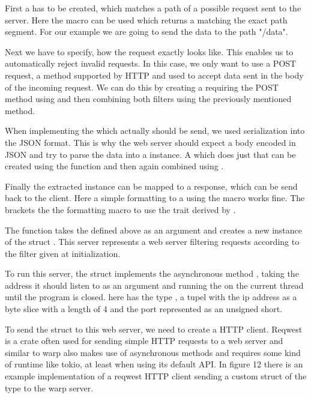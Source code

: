 First a  has to be created, which matches a path of a possible request sent to the server. Here the macro
 can be used which returns a  matching the exact path segment. For our example we
are going to send the data to the path "/data".

Next we have to specify, how the request exactly looks like. This enables us to automatically reject invalid requests.
In this case, we only want to use a POST request, a method supported by HTTP and used to accept data sent in the body
of the incoming request. We can do this by creating a  requiring the POST method using 
and then combining both filters using the previously mentioned  method.

When implementing the  which actually should be send, we used serialization into the JSON format. This is
why the web server should expect a body encoded in JSON and try to parse the data into a  instance. A
 which does just that can be created using the function  and then again combined
using .

Finally the extracted  instance can be mapped to a response, which can be send back to the client. Here a
simple formatting to a  using the  macro works fine. The  brackets the the
formatting macro to use the  trait derived by .

The function  takes the  defined above as an argument and creates a new instance of the
struct . This server represents a web server filtering requests according to the filter given at
initialization.

To run this server, the struct implements the asynchronous method , taking the address it should listen to
as an argument and running the  on the current thread until the program is closed.  here has
the type , a tupel with the ip address as a byte slice with a length of 4 and the port represented
as an unsigned short.

To send the struct to this web server, we need to create a HTTP client. Reqwest is a crate often used for sending
simple HTTP requests to a web server and similar to warp also makes use of asynchronous methods and requires some kind
of runtime like tokio, at least when using its default API. In figure 12 there is an example implementation of a
reqwest HTTP client sending a custom struct of the type  to the warp server.

